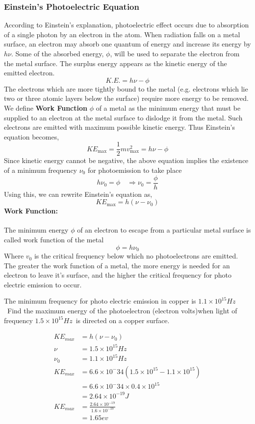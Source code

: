 \subsubsection{Einstein's Photoelectric Equation }
According to Einstein's explanation, photoelectric effect occurs due to absorption of a single photon by an electron in the atom. When radiation falls on a metal surface, an electron may absorb one quantum of energy and increase its energy by $h \nu $.  Some of the absorbed energy, $\phi$, will be used to separate the electron from the metal surface. The surplus energy appears as the kinetic energy of the emitted electron.
$$
K . E .=h \nu-\phi
$$
The electrons which are more tightly bound to the metal (e.g. electrons which lie two or three atomic layers below the surface) require more energy to be removed. We define \textbf{Work Function} $\phi$ of a metal as the minimum energy that must be supplied to an electron at the metal surface to dislodge it from the metal.  Such electrons are emitted with maximum possible kinetic energy. Thus Einstein's equation becomes,
$$
KE_{\max }=\frac{1}{2} m v_{\max }^{2}=h \nu-\phi
$$
Since kinetic energy cannot be negative, the above equation implies the existence of a minimum frequency $\nu_{0}$ for photoemission to take place
$$
h \nu_{0}=\phi \quad \Rightarrow {\nu }_{0}=\frac{\phi}{h}
$$
Using this, we can  rewrite Einstein's equation as,
$$
KE_{\max }=h\left(\nu-\nu_{0}\right)
$$
\textbf{Work Function:}\\\\
The minimum energy $\phi$ of an electron to escape from a particular metal surface is called work function of the metal 
$$\phi=h\nu_0$$
Where $v_0$ is the critical frequency below which no photoelectrons are emitted. The greater the work function of a metal, the more energy is needed for an electron to leave it's surface, and the higher the critical frequency for photo electric emission to occur.
\begin{exercise}
	The minimum frequency for photo electric emission in copper is $1.1\times10^{15} Hz$ \ Find the maximum energy of the photoelectron (electron volts)when light of frequency $1.5\times10^{15} Hz$\  is directed on a copper surface.
\end{exercise}
\begin{answer}
	\begin{align*}
	KE_{max}&=h(\nu-\nu_0)\\
	\nu&=1.5\times10^{15} Hz\\
	\nu_0&=1.1\times10^{15} Hz\\
	KE_{max}&=6.6\times10^-34(1.5\times10^{15}-1.1\times10^{15})\\
	&=6.6\times10^-34\times0.4\times10^{15}\\
	&=2.64\times10^{-19} J\\
	KE_{max}&=\frac{2.64\times10^{-19}}{1.6\times10^{-19}}\\
	&=1.65ev
	\end{align*}
\end{answer}

